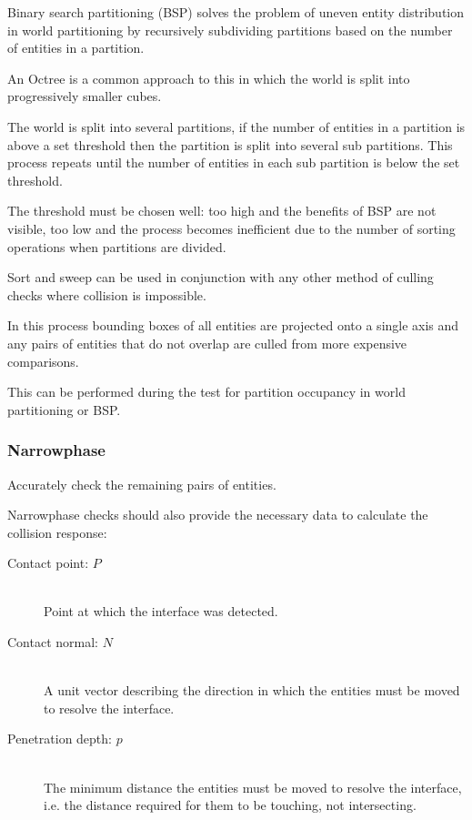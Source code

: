 \documentclass[a4paper]{article}
\begin{document}

Binary search partitioning (BSP) solves the problem of uneven entity
distribution in world partitioning by recursively subdividing partitions based
on the number of entities in a partition.

An Octree is a common approach to this in which the world is split into
progressively smaller cubes.

The world is split into several partitions, if the number of entities in a
partition is above a set threshold then the partition is split into several sub
partitions. This process repeats until the number of entities in each sub
partition is below the set threshold.

The threshold must be chosen well: too high and the benefits of BSP are not
visible, too low and the process becomes inefficient due to the number of
sorting operations when partitions are divided.


Sort and sweep can be used in conjunction with any other method of culling
checks where collision is impossible.

In this process bounding boxes of all entities are projected onto a single axis
and any pairs of entities that do not overlap are culled from more expensive
comparisons.

This can be performed during the test for partition occupancy in world
partitioning or BSP.

\subsubsection{Narrowphase}

Accurately check the remaining pairs of entities.

Narrowphase checks should also provide the necessary data to calculate the
collision response:

\begin{description}
  \item[Contact point: $P$] \hfill \\
    Point at which the interface was detected.
  \item[Contact normal: $N$] \hfill \\
    A unit vector describing the direction in which the entities must be moved
    to resolve the interface.
  \item[Penetration depth: $p$] \hfill \\
    The minimum distance the entities must be moved to resolve the interface,
    i.e. the distance required for them to be touching, not intersecting.
\end{description}
\end{document}
